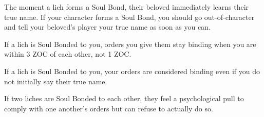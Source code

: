 \documentclass[green]{Sel}
\begin{document}
The moment a lich forms a Soul Bond, their beloved immediately learns their true name. If your character forms a Soul Bond, you should go out-of-character and tell your beloved's player your true name as soon as you can.

If a lich is Soul Bonded to you, orders you give them stay binding when you are within 3 ZOC of each other, not 1 ZOC.

If a lich is Soul Bonded to you, your orders are considered binding even if you do not initially say their true name.

If two liches are Soul Bonded to each other, they feel a psychological pull to comply with one another’s orders but can refuse to actually do so.
\end{document}
